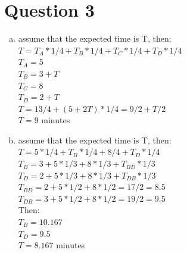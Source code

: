 \documentclass[11pt, a4paper]{article}
\begin{document}
\section*{Question 3}
\begin{enumerate}[(a)]
    \item
    assume that the expected time is T, then:\\
    $ T =  T_A * 1/4 + T_B * 1/4 + T_C * 1/4 + T_D * 1/4 $\\
    $ T_A = 5 $\\
    $ T_B = 3 + T $\\
    $ T_C = 8 $\\
    $ T_D = 2 + T $\\
    $ T =  13/4 +(5 + 2T) * 1/4 = 9/2 + T/2 $\\
    $ T = 9 $ minutes
    \item
    assume that the expected time is T, then:\\
    $ T =  5 * 1/4 + T_B * 1/4 + 8/4 + T_D * 1/4 $\\
    $ T_B = 3 + 5 * 1/3 + 8 * 1/3 + T_{BD} * 1/3 $ \\
    $ T_D = 2 + 5 * 1/3 + 8 * 1/3 + T_{DB} * 1/3 $\\
    $ T_{BD} = 2 + 5 * 1/2 + 8 * 1/2 = 17/2 = 8.5$\\
    $ T_{DB} = 3 + 5 * 1/2 + 8 * 1/2 = 19/2 = 9.5$\\
    Then:\\
    $ T_B =  10.167 $\\
    $ T_D = 9.5 $\\
    $ T = 8.167 $ minutes
\end{enumerate}
\end{document}
